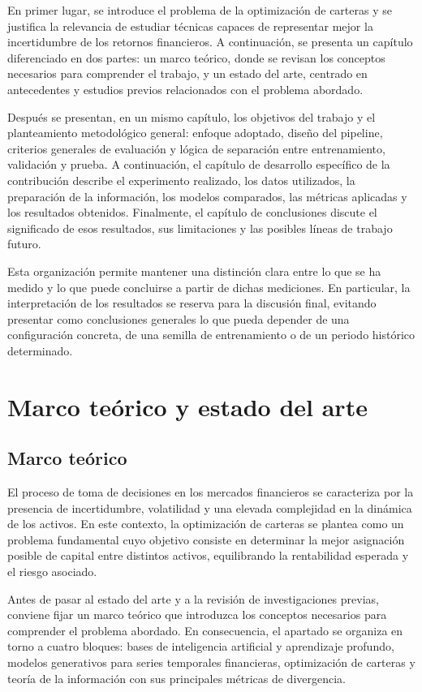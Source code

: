 \documentclass[11pt,a4paper,spanish,oneside]{book}
\numberwithin{equation}{chapter}
\numberwithin{figure}{chapter}
\begin{document}
En primer lugar, se introduce el problema de la optimización de carteras y se justifica la relevancia de estudiar técnicas capaces de representar mejor la incertidumbre de los retornos financieros. A continuación, se presenta un capítulo diferenciado en dos partes: un marco teórico, donde se revisan los conceptos necesarios para comprender el trabajo, y un estado del arte, centrado en antecedentes y estudios previos relacionados con el problema abordado.

Después se presentan, en un mismo capítulo, los objetivos del trabajo y el planteamiento metodológico general: enfoque adoptado, diseño del pipeline, criterios generales de evaluación y lógica de separación entre entrenamiento, validación y prueba. A continuación, el capítulo de desarrollo específico de la contribución describe el experimento realizado, los datos utilizados, la preparación de la información, los modelos comparados, las métricas aplicadas y los resultados obtenidos. Finalmente, el capítulo de conclusiones discute el significado de esos resultados, sus limitaciones y las posibles líneas de trabajo futuro.

Esta organización permite mantener una distinción clara entre lo que se ha medido y lo que puede concluirse a partir de dichas mediciones. En particular, la interpretación de los resultados se reserva para la discusión final, evitando presentar como conclusiones generales lo que pueda depender de una configuración concreta, de una semilla de entrenamiento o de un periodo histórico determinado.


\chapter{Marco teórico y estado del arte}

\section{Marco teórico}
El proceso de toma de decisiones en los mercados financieros se caracteriza por la presencia de incertidumbre, volatilidad y una elevada complejidad en la dinámica de los activos. En este contexto, la optimización de carteras se plantea como un problema fundamental cuyo objetivo consiste en determinar la mejor asignación posible de capital entre distintos activos, equilibrando la rentabilidad esperada y el riesgo asociado.

Antes de pasar al estado del arte y a la revisión de investigaciones previas, conviene fijar un marco teórico que introduzca los conceptos necesarios para comprender el problema abordado. En consecuencia, el apartado se organiza en torno a cuatro bloques: bases de inteligencia artificial y aprendizaje profundo, modelos generativos para series temporales financieras, optimización de carteras y teoría de la información con sus principales métricas de divergencia.
\end{document}

